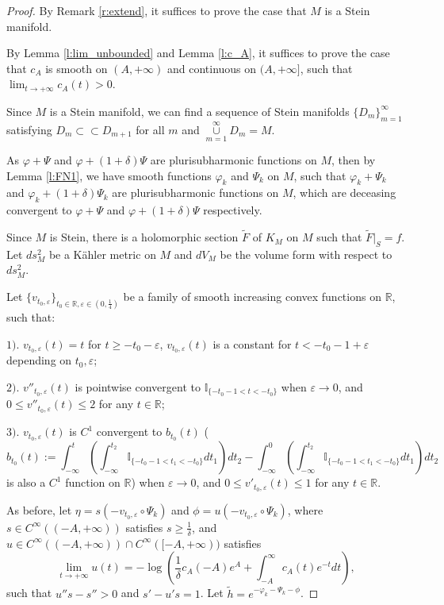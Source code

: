 \begin{proof}
By Remark \ref{r:extend}, it suffices to prove the case that $M$ is a Stein manifold.

By Lemma \ref{l:lim_unbounded} and Lemma \ref{l:c_A},
it suffices to prove the case that $c_{A}$ is smooth on $(A,+\infty)$ and continuous on $(A,+\infty]$,
such that $\lim_{t\to +\infty}c_{A}(t)>0$.

Since $M$ is a Stein manifold, we can find a sequence of Stein manifolds $\{D_m\}_{m=1}^\infty$
satisfying $D_m\subset\subset D_{m+1}$ for all $m$ and
$\overset{\infty}{\underset{m=1}{\cup}}D_m=M$.

As $\varphi+\Psi$ and $\varphi+(1+\delta)\Psi$ are plurisubharmonic functions on $M$,
then by Lemma \ref{l:FN1}, we have smooth functions $\varphi_{k}$ and $\Psi_{k}$ on $M$,
such that $\varphi_{k}+\Psi_{k}$ and $\varphi_{k}+(1+\delta)\Psi_{k}$ are plurisubharmonic functions on $M$,
which are deceasing convergent to $\varphi+\Psi$ and $\varphi+(1+\delta)\Psi$ respectively.

Since $M$ is Stein, there is a holomorphic section $\tilde{F}$ of
$K_{M}$ on $M$ such that $\tilde{F}|_{S}={f}$. Let $ds_{M}^{2}$ be a
K\"{a}hler metric on $M$ and $dV_{M}$ be the volume form with
respect to $ds_{M}^{2}$.

Let
$\{v_{t_0,\varepsilon}\}_{t_{0}\in\mathbb{R},\varepsilon\in(0,\frac{1}{4})}$
be a family of smooth increasing convex functions on $\mathbb{R}$,
such that:

 $1).$ $v_{t_{0},\varepsilon}(t)=t$ for $t\geq-t_{0}-\varepsilon$, $v_{t_{0},\varepsilon}(t)$ is a constant
 for $t<-t_{0}-1+\varepsilon$ depending
 on $t_{0},\varepsilon$;

 $2).$ $v''_{t_0,\varepsilon}(t)$ is pointwise convergent to $\mathbb{I}_{\{-t_{0}-1< t<-t_{0}\}}$
 when $\varepsilon\to 0$, and
 $0\leq v''_{t_0,\varepsilon}(t)\leq 2$ for any $t\in \mathbb{R}$;

 $3).$ $v_{t_0,\varepsilon}(t)$ is $C^{1}$ convergent to
 $b_{t_{0}}(t)$ ($$b_{t_{0}}(t):=
 \int_{-\infty}^{t}(\int_{-\infty}^{t_{2}}\mathbb{I}_{\{-t_{0}-1< t_{1}<-t_{0}\}}dt_{1})dt_{2}-\int_{-\infty}^{0}
 (\int_{-\infty}^{t_{2}}\mathbb{I}_{\{-t_{0}-1< t_{1}<-t_{0}\}}dt_{1})dt_{2}$$ is also a
 $C^1$ function on $\mathbb{R}$) when
 $\varepsilon\to 0$, and $0\leq v'_{t_0,\varepsilon}(t)\leq1$ for any $t\in \mathbb{R}$.

As before, let $\eta=s(-v_{t_{0},\varepsilon}\circ\Psi_{k})$ and
$\phi=u(-v_{t_{0},\varepsilon}\circ\Psi_{k})$, where $s\in
C^{\infty}((-A,+\infty))$ satisfies $s\geq \frac{1}{\delta}$, and
$u\in C^{\infty}((-A,+\infty))\cap C^{\infty}([-A,+\infty))$
satisfies
$$\lim_{t\to+\infty}u(t)=-\log(\frac{1}{\delta}c_{A}(-A)e^{A}+\int_{-A}^{\infty}c_{A}(t)e^{-t}dt),$$
such that $u''s-s''>0$ and $s'-u's=1$. Let
$\tilde{h}=e^{-\varphi_{k}-\Psi_{k}-\phi}$.


\end{proof}
